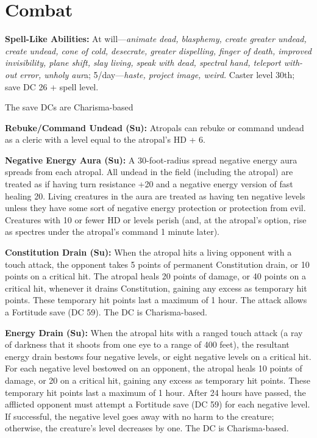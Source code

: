 \documentclass{article}
\begin{document}
\section*{Combat\textbf{ }}

\textbf{Spell-Like Abilities:} At will---\textit{animate dead, blasphemy, create 
greater undead, create undead, cone of cold, desecrate, greater dispelling, finger 
of death, improved invisibility, plane shift, slay living, speak with dead, spectral 
hand, teleport with-out error, unholy aur}a; 5/day---\textit{haste, project image, 
weird. }Caster level 30th; save DC 26 + spell level.

The save DCs are Charisma-based

\textbf{Rebuke/Command Undead (Su):} Atropals can rebuke or command undead as a 
cleric with a level equal to the atropal's HD + 6.

\textbf{Negative Energy Aura (Su):} A 30-foot-radius spread negative energy aura 
spreads from each atropal. All undead in the field (including the atropal) are 
treated as if having turn resistance +20 and a negative energy version of fast 
healing 20. Living creatures in the aura are treated as having ten negative levels 
unless they have some sort of negative energy protection or protection from evil. 
Creatures with 10 or fewer HD or levels perish (and, at the atropal's option, rise 
as spectres under the atropal's command 1 minute later). 

\textbf{Constitution Drain (Su):} When the atropal hits a living opponent with 
a touch attack, the opponent takes 5 points of permanent Constitution drain, or 
10 points on a critical hit. The atropal heals 20 points of damage, or 40 points 
on a critical hit, whenever it drains Constitution, gaining any excess as temporary 
hit points. These temporary hit points last a maximum of 1 hour. The attack allows 
a Fortitude save (DC 59). The DC is Charisma-based.

\textbf{Energy Drain (Su): }When the atropal hits with a ranged touch attack (a 
ray of darkness that it shoots from one eye to a range of 400 feet), the resultant 
energy drain bestows four negative levels, or eight negative levels on a critical 
hit. For each negative level bestowed on an opponent, the atropal heals 10 points 
of damage, or 20 on a critical hit, gaining any excess as temporary hit points. 
These temporary hit points last a maximum of 1 hour. After 24 hours have passed, 
the afflicted opponent must attempt a Fortitude save (DC 59) for each negative 
level. If successful, the negative level goes away with no harm to the creature; 
otherwise, the creature's level decreases by one. The DC is Charisma-based.
\end{document}
